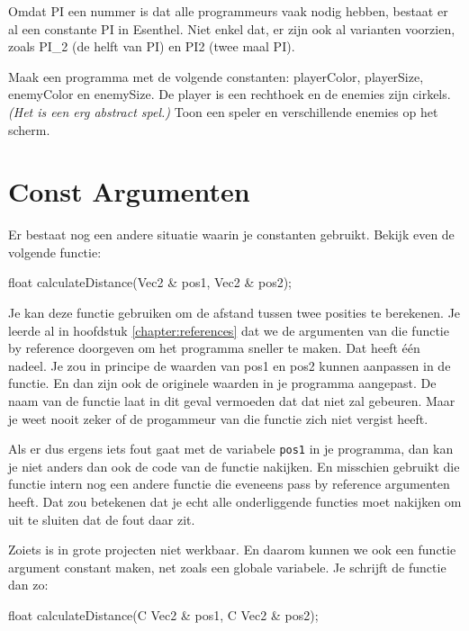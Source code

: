 \begin{note}
Omdat PI een nummer is dat alle programmeurs vaak nodig hebben, bestaat er al een constante PI in Esenthel. Niet enkel dat, er zijn ook al varianten voorzien, zoals PI\_2 (de helft van PI) en PI2 (twee maal PI).
\end{note}

\begin{exercise}
Maak een programma met de volgende constanten: playerColor, playerSize, enemyColor en enemySize. De player is een rechthoek en de enemies zijn cirkels. \textit{(Het is een erg abstract spel.)} Toon een speler en verschillende enemies op het scherm.
\end{exercise}

\section{Const Argumenten}
Er bestaat nog een andere situatie waarin je constanten gebruikt. Bekijk even de volgende functie:

\begin{code}
float calculateDistance(Vec2 & pos1, Vec2 & pos2);
\end{code}

Je kan deze functie gebruiken om de afstand tussen twee posities te berekenen. Je leerde al in hoofdstuk \ref{chapter:references} dat we de argumenten van die functie by reference doorgeven om het programma sneller te maken. Dat heeft \'e\'en nadeel. Je zou in principe de waarden van pos1 en pos2 kunnen aanpassen in de functie. En dan zijn ook de originele waarden in je programma aangepast. De naam van de functie laat in dit geval vermoeden dat dat niet zal gebeuren. Maar je weet nooit zeker of de progammeur van die functie zich niet vergist heeft.

Als er dus ergens iets fout gaat met de variabele \verb|pos1| in je programma, dan kan je niet anders dan ook de code van de functie  nakijken. En misschien gebruikt die functie intern nog een andere functie die eveneens pass by reference argumenten heeft. Dat zou betekenen dat je echt alle onderliggende functies moet nakijken om uit te sluiten dat de fout daar zit.

Zoiets is in grote projecten niet werkbaar. En daarom kunnen we ook een functie argument constant maken, net zoals een globale variabele. Je schrijft de functie dan zo:

\begin{code}
float calculateDistance(C Vec2 & pos1, C Vec2 & pos2);
\end{code}


